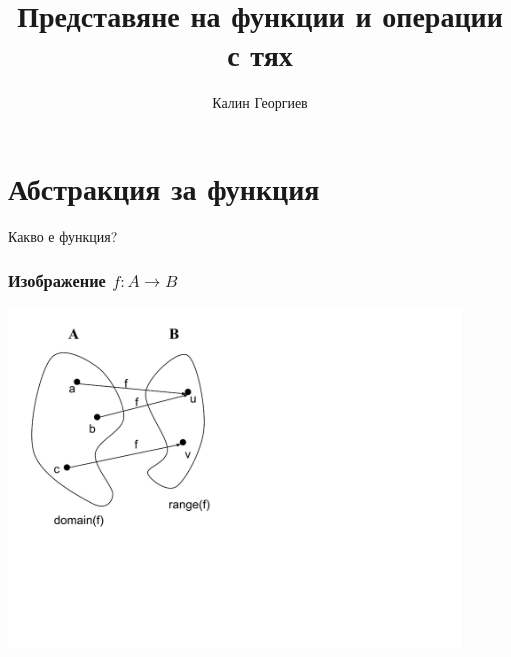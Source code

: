 \documentclass{beamer}
\begin{document}
\title[Обектно ориентирано програмиране]{Представяне на функции и операции с тях}
\author{Калин Георгиев}
\frame{\titlepage}

\section{Абстракция за функция}

\begin{frame}
\centerline{Какво е функция?}
\end{frame}




\begin{frame}[fragile]
\frametitle{Изображение $f:A\rightarrow B$}

\begin{center}
\includegraphics[width=12.0cm]{images/function_math}
\end{center}


\end{frame}
\end{document}
